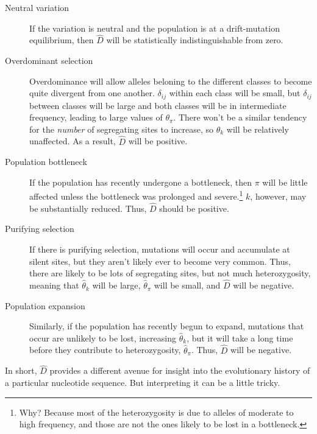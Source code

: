 \documentclass[12pt]{article}
\begin{document}
\begin{description}

\item[Neutral variation] If the variation is neutral and the
  population is at a drift-mutation equilibrium, then $\hat D$ will be
  statistically indistinguishable from zero.

\item[Overdominant selection] Overdominance will allow alleles
  beloning to the different classes to become quite divergent from one
  another. $\delta_{ij}$ within each class will be small, but
  $\delta_{ij}$ between classes will be large and both classes will be
  in intermediate frequency, leading to large values of
  $\theta_\pi$. There won't be a similar tendency for the {\it
  number\/} of segregating sites to increase, so $\theta_k$ will be
  relatively unaffected. As a result, $\hat D$ will be positive.

\item[Population bottleneck] If the population has recently undergone
  a bottleneck, then $\pi$ will be little affected unless the
  bottleneck was prolonged and severe.\footnote{Why? Because most of
    the heterozygosity is due to alleles of moderate to high
    frequency, and those are not the ones likely to be lost in a
    bottleneck.}  $k$, however, may be substantially reduced. Thus,
  $\hat D$ should be positive.

\item[Purifying selection] If there is purifying selection, mutations
  will occur and accumulate at silent sites, but they aren't likely
  ever to become very common. Thus, there are likely to be lots of
  segregating sites, but not much heterozygosity, meaning that
  $\hat\theta_k$ will be large, $\hat\theta_\pi$ will be small, and
  $\hat D$ will be negative.

\item[Population expansion] Similarly, if the population has recently
  begun to expand, mutations that occur are unlikely to be lost,
  increasing $\hat\theta_k$, but it will take a long time before they
  contribute to heterozygosity, $\hat\theta_\pi$. Thus, $\hat D$ will
  be negative.

\end{description}

In short, $\hat D$ provides a different avenue for insight into the
evolutionary history of a particular nucleotide sequence. But
interpreting it can be a little tricky. 
\end{document}

